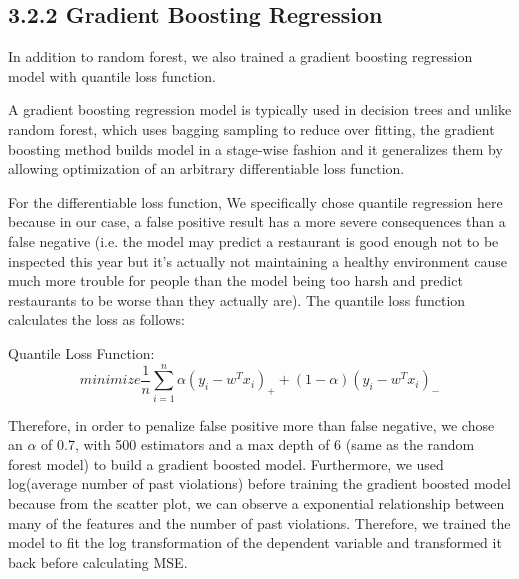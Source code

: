 \documentclass[letterpaper, 11 pt, conference]{ieeeconf}
\begin{document}
\subsection*{3.2.2 Gradient Boosting Regression}

In addition to random forest, we also trained a gradient boosting regression model with quantile loss function.

A gradient boosting regression model is typically used in decision trees and unlike random forest, which uses bagging sampling to reduce over fitting, the gradient boosting method builds model in a stage-wise fashion and it generalizes them by allowing optimization of an arbitrary differentiable loss function.

For the differentiable loss function, We specifically chose quantile regression here because in our case, a false positive result has a more severe consequences than a false negative (i.e. the model may predict a restaurant is good enough not to be inspected this year but it's actually not maintaining a healthy environment cause much more trouble for people than the model being too harsh and predict restaurants to be worse than they actually are). The quantile loss function calculates the loss as follows: 

Quantile Loss Function: \[ minimize\frac{1}{n}\sum_{i=1}^{n}  \alpha (y_i- w^T x_i)_+ + (1-\alpha) (y_i- w^T x_i)_- \]

Therefore, in order to penalize false positive more than false negative, we chose an $\alpha$ of 0.7, with 500 estimators and a max depth of 6 (same as the random forest model) to build a gradient boosted model. Furthermore, we used log(average number of past violations) before training the gradient boosted model because from the scatter plot, we can observe a exponential relationship between many of the features and the number of past violations. Therefore, we trained the model to fit the log transformation of the dependent variable and transformed it back before calculating MSE. 
\end{document}
